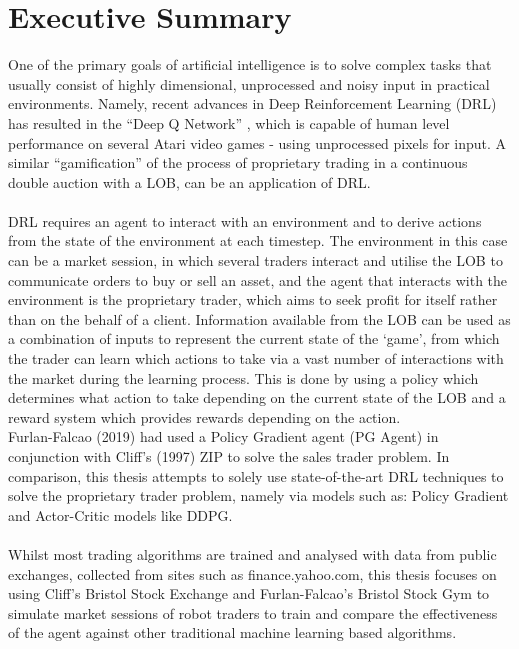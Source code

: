 \documentclass[ %
                    author={Ashwinder Khurana},
                supervisor={Prof Dave Cliff},
                    degree={MEng},
                     title={The Deeply Reinforced Trader},
                  subtitle={},
                      type={enterprise},
                      year={2020} ]{dissertation}
\begin{document}
\chapter*{Executive Summary}
\label{chap:Executive Summary}
\noindent
One of the primary goals of artificial intelligence is to solve complex tasks that usually consist of highly dimensional, unprocessed and noisy input in practical environments. Namely, recent advances in Deep Reinforcement Learning (DRL) has resulted in the \enquote{Deep Q Network} \cite{DQN}, which is capable of human level performance on several Atari video games - using unprocessed pixels for input. A similar \enquote{gamification} of the process of proprietary trading in a continuous double auction with a LOB, can be an application of DRL.
\\
\\
DRL requires an agent to interact with an environment and to derive actions from the state of the environment at each timestep. The environment in this case can be a market session, in which several traders interact and utilise the LOB to communicate orders to buy or sell an asset, and the agent that interacts with the environment is the proprietary trader, which aims to seek profit for itself rather than on the behalf of a client. Information available from the LOB can be used as a combination of inputs to represent the current state of the \enquote*{game}, from which the trader can learn which actions to take via a vast number of interactions with the market during the learning process. This is done by using a policy which determines what action to take depending on the current state of the LOB and a reward system which provides rewards depending on the action.
\\
Furlan-Falcao (2019) had used a Policy Gradient agent (PG Agent) in conjunction with Cliff's (1997) ZIP to solve the sales trader problem. In comparison, this thesis attempts to solely use state-of-the-art DRL techniques to solve the proprietary trader problem, namely via models such as: Policy Gradient and Actor-Critic models like DDPG. 
\\
\\
Whilst most trading algorithms are trained and analysed with data from public exchanges, collected from sites such as finance.yahoo.com, this thesis focuses on using Cliff's Bristol Stock Exchange \cite{BSE} and Furlan-Falcao's Bristol Stock Gym \cite{BSG} to simulate market sessions of robot traders to train and compare the effectiveness of the agent against other traditional machine learning based algorithms.
\end{document}

